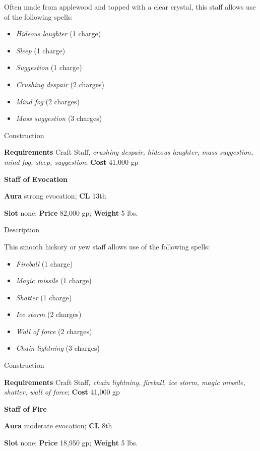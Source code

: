 Often made from applewood and topped with a clear crystal, this staff allows use of the following spells:
				\begin{itemize}\item  \textit{Hideous laughter} (1 charge)
				\item  \textit{Sleep} (1 charge)
				\item  \textit{Suggestion} (1 charge)
				\item  \textit{Crushing despair} (2 charges)
				\item  \textit{Mind fog} (2 charges)
				\item  \textit{Mass suggestion} (3 charges) 
\end{itemize}
				
Construction
				
\textbf{Requirements} Craft Staff, \textit{crushing despair, hideous laughter, mass suggestion, mind fog, sleep, suggestion}; \textbf{Cost }41,000 gp
				
\textbf{Staff of Evocation}
				
\textbf{Aura} strong evocation; \textbf{CL} 13th
				
\textbf{Slot} none; \textbf{Price} 82,000 gp; \textbf{Weight} 5 lbs.
				
Description
				
This smooth hickory or yew staff allows use of the following spells:
				\begin{itemize}\item  \textit{Fireball} (1 charge)
				\item  \textit{Magic missile} (1 charge)
				\item  \textit{Shatter} (1 charge)
				\item  \textit{Ice storm} (2 charges)
				\item  \textit{Wall of force} (2 charges)
				\item  \textit{Chain lightning} (3 charges) 
\end{itemize}
				
Construction
				
\textbf{Requirements} Craft Staff\textit{, chain lightning, fireball, ice storm, magic missile, shatter, wall of force};\textbf{ Cost }41,000 gp
				
\textbf{Staff of Fire}
				
\textbf{Aura} moderate evocation; \textbf{CL} 8th
				
\textbf{Slot }none; \textbf{Price} 18,950 gp; \textbf{Weight} 5 lbs.
				
